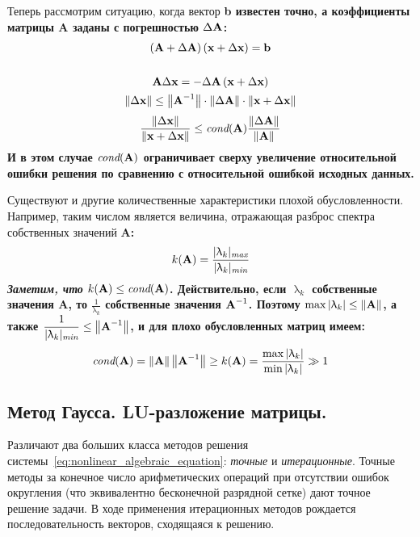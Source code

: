 Теперь рассмотрим ситуацию, когда вектор \bf{b} известен точно, а коэффициенты матрицы \bf{A} заданы с
погрешностью $\Delta \bf{A}$:
\begin{gather*}
    \left( \bf{A} + \Delta \bf{A} \right)\left( \bf{x} + \Delta \bf{x} \right) = \bf{b}\\
    \\
    \bf{A}\Delta \bf{x} = - \Delta \bf{A} \left( \bf{x} + \Delta \bf{x} \right)\\
    \left\| \Delta \bf{x} \right\| \leq \left\| \bf{A}^{-1} \right\| \cdot \left\| \Delta \bf{A} \right\| \cdot \left\| \bf{x} + \Delta \bf{x} \right\|
\end{gather*}
\begin{equation}
    \frac{\left\| \Delta \bf{x} \right\|}{\left\| \bf{x} + \Delta \bf{x} \right\|} \leq \textit{cond}(\bf{A}) \frac{\left\| \Delta \bf{A} \right\|}{\left\| \bf{A} \right\|}
\end{equation}
И в этом случае $\textit{cond}(\bf{A})$ ограничивает сверху увеличение относительной ошибки решения по сравнению с
относительной ошибкой исходных данных.
\vspace{10pt}

Существуют и другие количественные характеристики плохой обусловленности. Например, таким числом является
величина, отражающая разброс спектра собственных значений \bf{A}:
\begin{equation*}
    k(\bf{A}) = \frac{\displaystyle |\uplambda_k|_{\textit{max}}}{\displaystyle |\uplambda_k|_{\textit{min}}}
\end{equation*}
\emph{Заметим, что} $k(\bf{A}) \leq \textit{cond}(\bf{A})$. Действительно, если $\uplambda_k$ собственные
значения \bf{A}, то $\displaystyle \frac{1}{\uplambda_k}$ собственные значения $\bf{A}^{-1}$. Поэтому
$\displaystyle \max |\uplambda_k| \leq \left\| \bf{A} \right\|$, а также $\displaystyle \frac{1}{|\uplambda_k|_{\textit{min}}} \leq \left\| \bf{A}^{-1} \right\|$,
и для плохо обусловленных матриц имеем:
\begin{equation*}
    \textit{cond}(\bf{A}) = \left\| \bf{A} \right\| \left\| \bf{A}^{-1} \right\| \geq k(\bf{A}) = \frac{\max|\uplambda_k|}{\min|\uplambda_k|} \gg 1
\end{equation*}

\subsection{Метод Гаусса. \textbf{LU}-разложение матрицы.}
Различают два больших класса методов решения системы~\eqref{eq:nonlinear_algebraic_equation}: \emph{точные} и
\emph{итерационные}. Точные методы за конечное число арифметических операций при отсутствии ошибок округления
(что эквивалентно бесконечной разрядной сетке) дают точное решение задачи. В ходе применения итерационных методов
рождается последовательность векторов, сходящаяся к решению.

